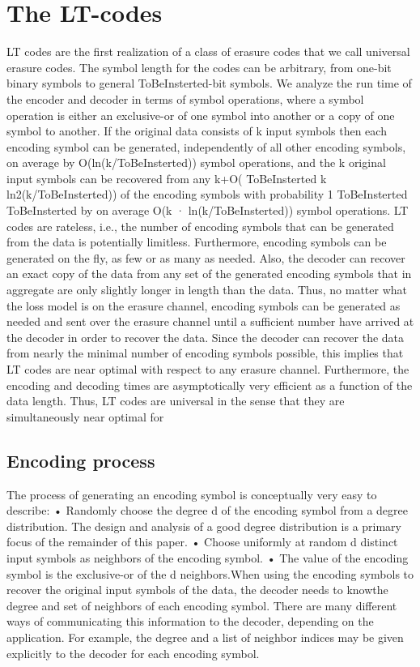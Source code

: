 \documentclass[12pt,a4paper,titlepage,twocolumn]{article}
\begin{document}
\section{The LT-codes}
LT codes are the first realization of a class of erasure
codes that we call universal erasure codes. The symbol
length for the codes can be arbitrary, from one-bit binary
symbols to general ToBeInsterted-bit symbols. We analyze the run time
of the encoder and decoder in terms of symbol operations,
where a symbol operation is either an exclusive-or of one
symbol into another or a copy of one symbol to another. If
the original data consists of k input symbols then each encoding
symbol can be generated, independently of all other
encoding symbols, on average by O(ln(k/ToBeInsterted)) symbol operations,
and the k original input symbols can be recovered
from any k+O(
ToBeInsterted
k ln2(k/ToBeInsterted)) of the encoding symbols with
probability 1 ToBeInsterted ToBeInsterted by on average O(k · ln(k/ToBeInsterted)) symbol operations.
LT codes are rateless, i.e., the number of encoding symbols
that can be generated from the data is potentially limitless.
Furthermore, encoding symbols can be generated on
the fly, as few or as many as needed. Also, the decoder can
recover an exact copy of the data from any set of the generated
encoding symbols that in aggregate are only slightly
longer in length than the data. Thus, no matter what the
loss model is on the erasure channel, encoding symbols can
be generated as needed and sent over the erasure channel
until a sufficient number have arrived at the decoder in order
to recover the data. Since the decoder can recover the
data from nearly the minimal number of encoding symbols
possible, this implies that LT codes are near optimal with
respect to any erasure channel. Furthermore, the encoding
and decoding times are asymptotically very efficient as a
function of the data length. Thus, LT codes are universal
in the sense that they are simultaneously near optimal for
\subsection{Encoding process}
The process of generating an encoding symbol is conceptually
very easy to describe:
• Randomly choose the degree d of the encoding symbol
from a degree distribution. The design and analysis of
a good degree distribution is a primary focus of the
remainder of this paper.
• Choose uniformly at random d distinct input symbols
as neighbors of the encoding symbol.
• The value of the encoding symbol is the exclusive-or
of the d neighbors.When using the encoding symbols to recover the original
input symbols of the data, the decoder needs to knowthe degree
and set of neighbors of each encoding symbol. There
are many different ways of communicating this information
to the decoder, depending on the application. For example,
the degree and a list of neighbor indices may be given
explicitly to the decoder for each encoding symbol.
\end{document}
